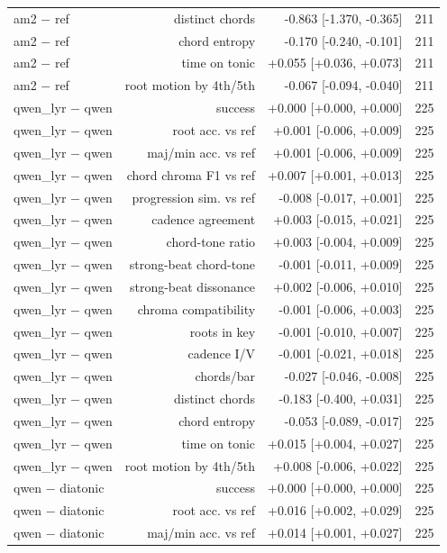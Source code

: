 \begin{table}[t]
\begin{tabular}{lrrr}
am2 $-$ ref & distinct chords & -0.863 [-1.370, -0.365] & 211 \\
am2 $-$ ref & chord entropy & -0.170 [-0.240, -0.101] & 211 \\
am2 $-$ ref & time on tonic & +0.055 [+0.036, +0.073] & 211 \\
am2 $-$ ref & root motion by 4th/5th & -0.067 [-0.094, -0.040] & 211 \\
qwen\_lyr $-$ qwen & success & +0.000 [+0.000, +0.000] & 225 \\
qwen\_lyr $-$ qwen & root acc. vs ref & +0.001 [-0.006, +0.009] & 225 \\
qwen\_lyr $-$ qwen & maj/min acc. vs ref & +0.001 [-0.006, +0.009] & 225 \\
qwen\_lyr $-$ qwen & chord chroma F1 vs ref & +0.007 [+0.001, +0.013] & 225 \\
qwen\_lyr $-$ qwen & progression sim. vs ref & -0.008 [-0.017, +0.001] & 225 \\
qwen\_lyr $-$ qwen & cadence agreement & +0.003 [-0.015, +0.021] & 225 \\
qwen\_lyr $-$ qwen & chord-tone ratio & +0.003 [-0.004, +0.009] & 225 \\
qwen\_lyr $-$ qwen & strong-beat chord-tone & -0.001 [-0.011, +0.009] & 225 \\
qwen\_lyr $-$ qwen & strong-beat dissonance & +0.002 [-0.006, +0.010] & 225 \\
qwen\_lyr $-$ qwen & chroma compatibility & -0.001 [-0.006, +0.003] & 225 \\
qwen\_lyr $-$ qwen & roots in key & -0.001 [-0.010, +0.007] & 225 \\
qwen\_lyr $-$ qwen & cadence I/V & -0.001 [-0.021, +0.018] & 225 \\
qwen\_lyr $-$ qwen & chords/bar & -0.027 [-0.046, -0.008] & 225 \\
qwen\_lyr $-$ qwen & distinct chords & -0.183 [-0.400, +0.031] & 225 \\
qwen\_lyr $-$ qwen & chord entropy & -0.053 [-0.089, -0.017] & 225 \\
qwen\_lyr $-$ qwen & time on tonic & +0.015 [+0.004, +0.027] & 225 \\
qwen\_lyr $-$ qwen & root motion by 4th/5th & +0.008 [-0.006, +0.022] & 225 \\
qwen $-$ diatonic & success & +0.000 [+0.000, +0.000] & 225 \\
qwen $-$ diatonic & root acc. vs ref & +0.016 [+0.002, +0.029] & 225 \\
qwen $-$ diatonic & maj/min acc. vs ref & +0.014 [+0.001, +0.027] & 225 \\

\end{tabular}
\end{table}
